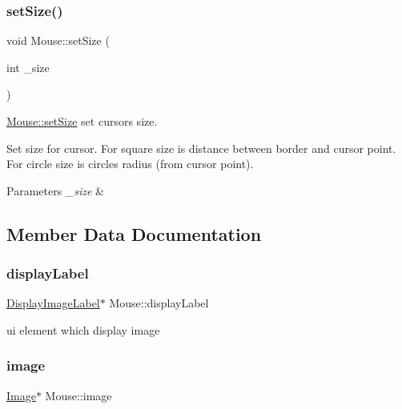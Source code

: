 \subsubsection{\texorpdfstring{setSize()}{setSize()}}
{\footnotesize\ttfamily void Mouse\+::set\+Size (\begin{DoxyParamCaption}\item[{int}]{\+\_\+size }\end{DoxyParamCaption})\hspace{0.3cm}{\ttfamily [virtual]}}



\mbox{\hyperlink{class_mouse_adac1d60637770e2739f06ac6f1f88b7b}{Mouse\+::set\+Size}} set cursor\textquotesingle{}s size. 

Set size for cursor. For square size is distance between border and cursor point. For circle size is circle\textquotesingle{}s radius (from cursor point). 
\begin{DoxyParams}{Parameters}
{\em \+\_\+size} & \\
\hline
\end{DoxyParams}


\subsection{Member Data Documentation}
\mbox{\label{class_mouse_a24d49b322c8d63c9805975b316753999}} 
\subsubsection{\texorpdfstring{displayLabel}{displayLabel}}
{\footnotesize\ttfamily \mbox{\hyperlink{class_display_image_label}{Display\+Image\+Label}}$\ast$ Mouse\+::display\+Label\hspace{0.3cm}{\ttfamily [protected]}}

ui element which display image \mbox{\label{class_mouse_ac4431c10f6f337649de7cc643d8d01fc}} 
\subsubsection{\texorpdfstring{image}{image}}
{\footnotesize\ttfamily \mbox{\hyperlink{class_image}{Image}}$\ast$ Mouse\+::image\hspace{0.3cm}{\ttfamily [protected]}}

